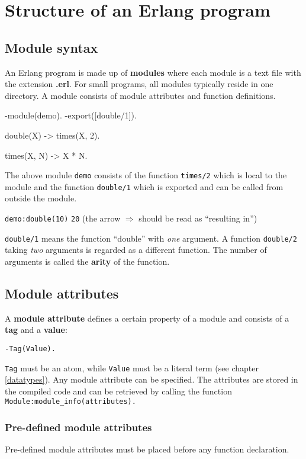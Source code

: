 \chapter{Structure of an Erlang program}

\section{Module syntax}

An Erlang program is made up of \textbf{modules} where each module is
a text file with the extension \textbf{.erl}. For small programs, all
modules typically reside in one directory.
A module consists of module attributes and function definitions.

\begin{erlang}
-module(demo).
-export([double/1]).

double(X) -> times(X, 2).

times(X, N) -> X * N.
\end{erlang}

The above module \texttt{demo} consists of the function \texttt{times/2}
which is local to the module and the function \texttt{double/1} which
is exported and can be called from outside the module.

\texttt{demo:double(10)} \resultingin \texttt{20}\hfill
(the arrow $\Rightarrow$ should be read as ``resulting in'')

\texttt{double/1} means the function ``double'' with \textit{one}
argument. A function \texttt{double/2} taking \textit{two} arguments
is regarded as a different function. The number of arguments is called
the \textbf{arity} of the function.


\section{Module attributes}
A \textbf{module attribute} defines a certain property of a module and
consists of a \textbf{tag} and a \textbf{value}:

\texttt{-Tag(Value).}

\texttt{Tag} must be an atom, while \texttt{Value} must be a literal
term (see chapter \ref{datatypes}). Any module attribute can be specified. The
attributes are stored in the compiled code and can be retrieved by
calling the function \texttt{Module:module\_info(attributes).}

\subsection{Pre-defined module attributes}
Pre-defined module attributes must be placed before any function
declaration.

